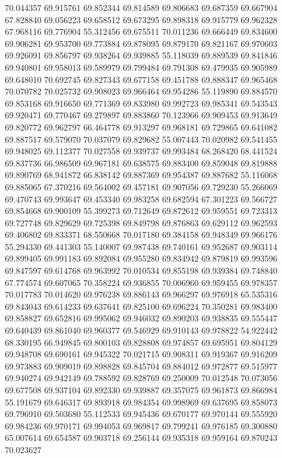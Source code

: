 70.044357
69.915761
69.852344
69.814589
69.806683
69.687359
69.667904
67.828840
69.056223
69.658512
69.673295
69.898318
69.915779
69.962328
67.968116
69.776904
55.312456
69.675511
70.011236
69.666449
69.834600
69.906281
69.953700
69.773884
69.878095
69.879170
69.821167
69.970603
69.926091
69.856797
69.938264
69.939885
55.118039
69.889539
69.841846
69.940801
69.958013
69.589979
69.799484
69.791308
69.479935
69.905989
69.648010
70.692745
69.827343
69.677158
69.451788
69.888347
69.965468
70.070782
70.025732
69.908023
69.966464
69.954286
55.119890
69.884570
69.853168
69.916650
69.771369
69.833980
69.992723
69.985341
69.543543
69.920471
69.770467
69.279897
69.883860
70.123966
69.909453
69.913649
69.820772
69.962797
66.464778
69.913297
69.968181
69.729865
69.641082
69.887517
69.579070
70.037079
69.829682
55.007443
70.020982
69.541455
69.948025
69.112377
70.027558
69.939737
69.993484
68.268420
68.441524
69.837736
66.986509
69.967181
69.638575
69.883400
69.859048
69.819888
69.890769
68.941872
66.838142
69.887369
69.954387
69.887682
55.116068
69.885065
67.370216
69.564002
69.457181
69.907056
69.729230
55.266069
69.470743
69.993647
69.453340
69.983258
69.682594
67.301223
69.566727
69.854668
69.900109
55.399273
69.712649
69.872612
69.959551
69.723313
69.727748
69.829629
69.725398
69.849798
69.876863
69.629112
69.962593
69.406802
69.833371
68.550668
70.017180
69.384158
69.948349
69.966176
55.294330
69.441303
55.140007
69.987438
69.740161
69.952687
69.903114
69.899405
69.991183
69.892084
69.955280
69.834942
69.879819
69.993596
69.847597
69.614768
69.963992
70.010534
69.855198
69.939384
69.748840
67.774574
69.607065
70.358224
69.936855
70.006960
69.959455
69.978357
70.017783
70.014620
69.976238
69.886143
69.966297
69.976918
65.535316
69.843043
69.614233
69.637641
69.825100
69.696224
70.350281
69.983400
69.858827
69.652816
69.995062
69.946032
69.890203
69.938835
69.555447
69.640439
69.861040
69.960377
69.546929
69.910143
69.978822
54.922442
68.330195
66.949845
69.800103
69.828808
69.974857
69.695951
69.804129
69.948708
69.690161
69.945322
70.021715
69.908311
69.919367
69.916209
69.973883
69.909019
69.898828
69.845704
69.884012
69.972877
69.515977
69.940274
69.942149
69.788592
69.828769
69.250009
70.012548
70.073056
69.677508
69.937104
69.892330
69.939887
69.357075
69.961873
69.866984
55.191679
69.646317
69.893918
69.984354
69.998969
69.637695
69.858073
69.796910
69.503680
55.112533
69.945436
69.670177
69.970144
69.555920
69.984236
69.970171
69.994053
69.969817
69.799241
69.976185
69.300880
65.007614
69.654587
69.903718
69.256144
69.935318
69.959164
69.870243
70.023627
